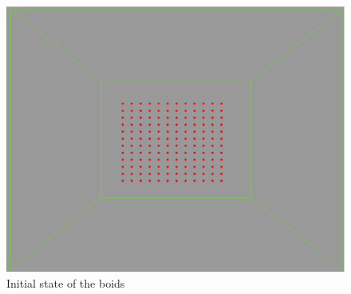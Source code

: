 \begin{figure}[htbp]
\begin{center}
\includegraphics[scale=0.15]{figures/align.eps}
\caption{Initial state of the boids}
\label{alignRule}
\end{center}
\end{figure}

